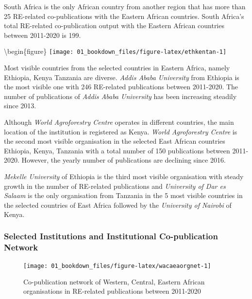 \documentclass[
]{book}
\begin{document}
South Africa is the only African country from another region that has more than 25 RE-related co-publications with the Eastern African countries. South Africa's total RE-related co-publication output with the Eastern African countries between 2011-2020 is 199.

\textbackslash begin\{figure\}
\texttt{[image: 01\_bookdown\_files/figure-latex/ethkentan-1]}

Most visible countries from the selected countries in Eastern Africa, namely Ethiopia, Kenya Tanzania are diverse. \emph{Addis Ababa University} from Ethiopia is the most visible one with 246 RE-related publications between 2011-2020. The number of publications of \emph{Addis Ababa University} has been increasing steadily since 2013.

Although \emph{World Agroforestry Centre} operates in different countries, the main location of the institution is registered as Kenya. \emph{World Agroforestry Centre} is the second most visible organisation in the selected East African countries Ethiopia, Kenya, Tanzania with a total number of 150 publications between 2011-2020. However, the yearly number of publications are declining since 2016.

\emph{Mekelle University} of Ethiopia is the third most visible organisation with steady growth in the number of RE-related publications and \emph{University of Dar es Salaam} is the only organisation from Tanzania in the 5 most visible countries in the selected countries of East Africa followed by the \emph{University of Nairobi} of Kenya.

\hypertarget{selected-institutions-and-institutional-co-publication-network}{%
\subsubsection{Selected Institutions and Institutional Co-publication Network}\label{selected-institutions-and-institutional-co-publication-network}}

\begin{figure}
\texttt{[image: 01\_bookdown\_files/figure-latex/wacaeaorgnet-1]} \caption{Co-publication network of Western, Central, Eastern African organisations in RE-related publications between 2011-2020}\label{fig:wacaeaorgnet}
\end{figure}
\end{document}
